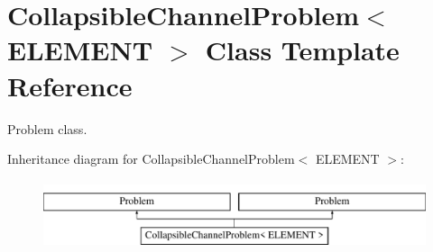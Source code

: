 \hypertarget{classCollapsibleChannelProblem}{}\section{Collapsible\+Channel\+Problem$<$ E\+L\+E\+M\+E\+NT $>$ Class Template Reference}
\label{classCollapsibleChannelProblem}


Problem class.  


Inheritance diagram for Collapsible\+Channel\+Problem$<$ E\+L\+E\+M\+E\+NT $>$\+:\begin{figure}[H]
\begin{center}
\leavevmode
\includegraphics[height=2.000000cm]{classCollapsibleChannelProblem}
\end{center}
\end{figure}
